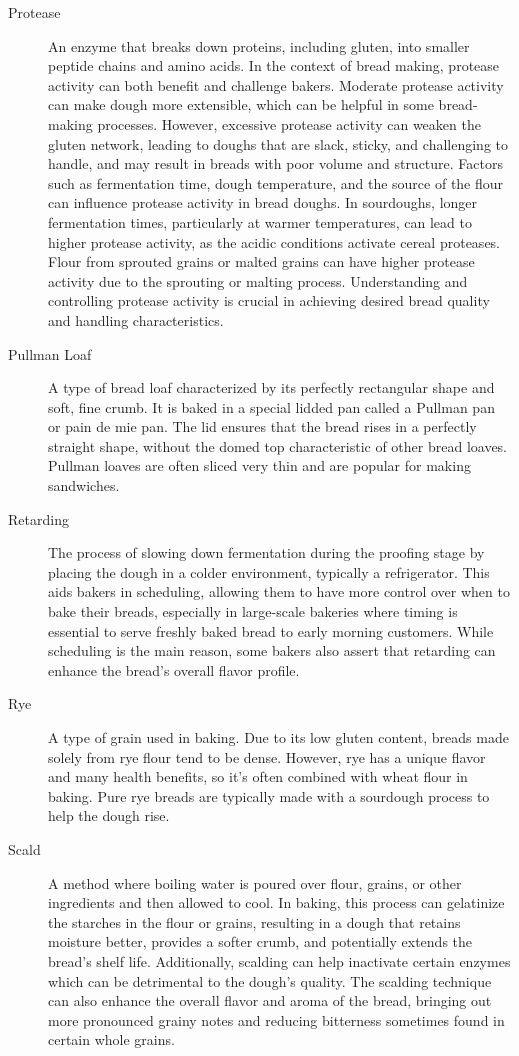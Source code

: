 \begin{description}
\item[Protease] An enzyme that breaks down proteins, including gluten, into smaller
peptide chains and amino acids. In the context of bread making, protease activity can
both benefit and challenge bakers. Moderate protease activity can make dough more
extensible, which can be helpful in some bread-making processes. However, excessive
protease activity can weaken the gluten network, leading to doughs that are slack,
sticky, and challenging to handle, and may result in breads with poor volume and
structure. Factors such as fermentation time, dough temperature, and the source of the
flour can influence protease activity in bread doughs. In sourdoughs, longer
fermentation times, particularly at warmer temperatures, can lead to higher protease
activity, as the acidic conditions activate cereal proteases. Flour from sprouted
grains or malted grains can have higher protease activity due to the sprouting or
malting process. Understanding and controlling protease activity is crucial in
achieving desired bread quality and handling characteristics.

\item[Pullman Loaf] A type of bread loaf characterized by its perfectly rectangular
shape and soft, fine crumb. It is baked in a special lidded pan called a Pullman pan
or pain de mie pan. The lid ensures that the bread rises in a perfectly straight
shape, without the domed top characteristic of other bread loaves. Pullman loaves are
often sliced very thin and are popular for making sandwiches.

\item[Retarding] The process of slowing down fermentation during the proofing
stage by placing the dough in a colder environment, typically a refrigerator. This aids
bakers in scheduling, allowing them to have more control over when to bake their breads,
especially in large-scale bakeries where timing is essential to serve freshly baked bread
to early morning customers. While scheduling is the main reason, some bakers also assert
that retarding can enhance the bread's overall flavor profile.

\item[Rye] A type of grain used in baking. Due to its low gluten content, breads
made solely from rye flour tend to be dense. However, rye has a unique flavor and
many health benefits, so it's often combined with wheat flour in baking. Pure rye
breads are typically made with a sourdough process to help the dough rise.

\item[Scald] A method where boiling water is poured over flour, grains, or other
ingredients and then allowed to cool. In baking, this process can gelatinize the
starches in the flour or grains, resulting in a dough that retains moisture better,
provides a softer crumb, and potentially extends the bread's shelf life. Additionally,
scalding can help inactivate certain enzymes which can be detrimental to the dough's
quality. The scalding technique can also enhance the overall flavor and aroma of
the bread, bringing out more pronounced grainy notes and reducing bitterness
sometimes found in certain whole grains.


\end{description}
